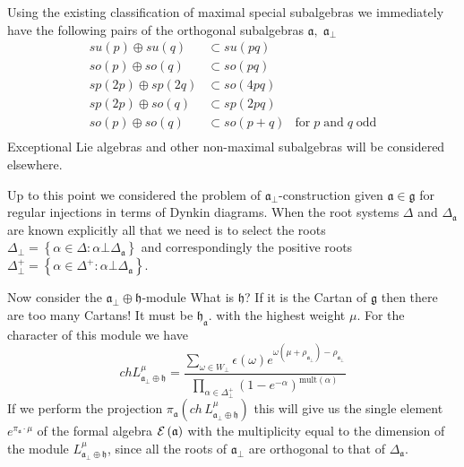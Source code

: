 \documentclass[a4paper,12pt]{article}
\theoremstyle{definition} \newtheorem{Def}{Definition}
\begin{document}
Using the existing classification of maximal special subalgebras \cite{dynkin1952semisimple} we immediately have the following pairs of the orthogonal subalgebras $\mathfrak{a},\;\mathfrak{a}_{\bot}$
\begin{equation}
  \label{eq:42}
  \begin{array}{lll}
      su(p)\oplus su(q) & \subset su(pq) &\\
      so(p)\oplus so(q) & \subset so(pq) &\\
      sp(2p)\oplus sp(2q) & \subset so(4pq)&\\
      sp(2p)\oplus so(q) & \subset sp(2pq)&\\
      so(p)\oplus so(q) & \subset so(p+q)& \text{for}\;p\;\text{and}\;q\;\text{odd}\\
  \end{array}
\end{equation}
{\color{blue} Exceptional Lie algebras and other non-maximal subalgebras will be considered elsewhere.}

{\color{blue} Up to this point we considered the problem of $\mathfrak{a}_{\bot}$-construction given $\mathfrak{a}\in\mathfrak{g}$ for regular injections in terms of Dynkin diagrams. When the root systems $ \Delta$ and $\Delta_{\mathfrak{a}}$ are known explicitly all that we need is to select the roots  
$\Delta_{\bot}=\left\{\alpha\in \Delta:\alpha\bot \Delta_{\mathfrak{a}}\right\}$ and correspondingly the positive roots
$\Delta^{+}_{\bot}=\left\{\alpha\in \Delta^{+}:\alpha\bot \Delta_{\mathfrak{a}}\right\}$. }

Now consider the $\mathfrak{a}_{\bot}\oplus\mathfrak{h}$-module 
{\color{red} What is $\mathfrak{h}$? If it is the Cartan of $\mathfrak{g}$ then there are too many Cartans! It must be $\mathfrak{h}_{\mathfrak{a}}$.}
with the highest weight $\mu$. For the character of this module we have
\begin{equation}
  \label{eq:41}
  ch L^{\mu}_{\mathfrak{a}_{\bot}\oplus \mathfrak{h}}= \frac{\sum_{\omega\in W_{\bot}} \epsilon(\omega) e^{\omega(\mu+\rho_{\mathfrak{a}_{\bot}})-\rho_{\mathfrak{a}_{\bot}}}}{\prod_{\alpha\in\Delta^{+}_{\bot}}(1-e^{-\alpha})^{\mathrm{mult}(\alpha)}}
\end{equation}
If we perform the projection $\pi_{\mathfrak{a}}(ch\, L^{\mu}_{\mathfrak{a}_{\bot}\oplus \mathfrak{h}})$ this will give us the single element $e^{\pi_{\mathfrak{a}} \cdot\mu}$ of the formal algebra ${\cal E}\left( \mathfrak{a}\right)$ with the multiplicity equal to the dimension of the module $L^{\mu}_{\mathfrak{a}_{\bot}\oplus \mathfrak{h}}$, since all the roots of $\mathfrak{a}_{\bot}$ are orthogonal to  that of $\Delta_{\mathfrak{a}}$.
\end{document}

